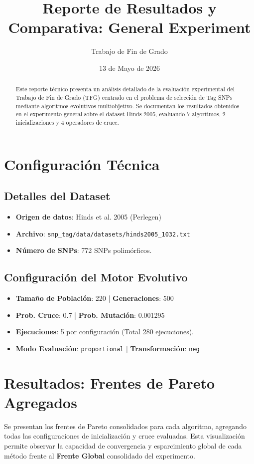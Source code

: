 \documentclass[a4paper,10pt]{article}
\title{Reporte de Resultados y Comparativa: General Experiment}
\author{Trabajo de Fin de Grado}
\date{13 de Mayo de 2026}
\begin{document}
\maketitle

\begin{abstract}
Este reporte técnico presenta un análisis detallado de la evaluación experimental del Trabajo de Fin de Grado (TFG) centrado en el problema de selección de Tag SNPs mediante algoritmos evolutivos multiobjetivo. Se documentan los resultados obtenidos en el experimento general sobre el dataset Hinds 2005, evaluando 7 algoritmos, 2 inicializaciones y 4 operadores de cruce.
\end{abstract}

{
\setlength{\parskip}{0pt}
\tableofcontents
}

\newpage

\section{Configuración Técnica}
\subsection{Detalles del Dataset}
\begin{itemize}
    \item \textbf{Origen de datos}: Hinds et al. 2005 (Perlegen)
    \item \textbf{Archivo}: \texttt{snp\_tag/data/datasets/hinds2005\_1032.txt}
    \item \textbf{Número de SNPs}: 772 SNPs polimórficos.
\end{itemize}

\subsection{Configuración del Motor Evolutivo}
\begin{itemize}
    \item \textbf{Tamaño de Población}: 220 | \textbf{Generaciones}: 500
    \item \textbf{Prob. Cruce}: 0.7 | \textbf{Prob. Mutación}: 0.001295
    \item \textbf{Ejecuciones}: 5 por configuración (Total 280 ejecuciones).
    \item \textbf{Modo Evaluación}: \texttt{proportional} | \textbf{Transformación}: \texttt{neg}
\end{itemize}

\section{Resultados: Frentes de Pareto Agregados}
Se presentan los frentes de Pareto consolidados para cada algoritmo, agregando todas las configuraciones de inicialización y cruce evaluadas. Esta visualización permite observar la capacidad de convergencia y esparcimiento global de cada método frente al \textbf{Frente Global} consolidado del experimento.
\end{document}

